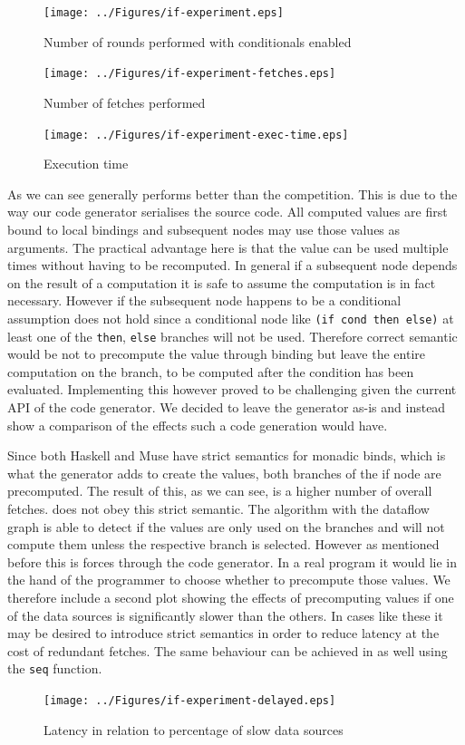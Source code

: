 \begin{figure}
    \texttt{[image: ../Figures/if-experiment.eps]}
    \caption{Number of rounds performed with conditionals enabled}
\end{figure}

\begin{figure}
    \texttt{[image: ../Figures/if-experiment-fetches.eps]}
    \caption{Number of fetches performed}
\end{figure}

\begin{figure}
    \texttt{[image: ../Figures/if-experiment-exec-time.eps]}
    \caption{Execution time}
\end{figure}

As we can see \yauhau{} generally performs better than the competition.
This is due to the way our code generator serialises the source code.
All computed values are first bound to local bindings and subsequent nodes may use those values as arguments.
The practical advantage here is that the value can be used multiple times without having to be recomputed.
In general if a subsequent node depends on the result of a computation it is safe to assume the computation is in fact necessary.
However if the subsequent node happens to be a conditional assumption does not hold since a conditional node like \texttt{(if cond then else)} at least one of the \texttt{then}, \texttt{else} branches will not be used.
Therefore correct semantic would be not to precompute the value through binding but leave the entire computation on the branch, to be computed after the condition has been evaluated.
Implementing this however proved to be challenging given the current API of the code generator.
We decided to leave the generator as-is and instead show a comparison of the effects such a code generation would have.

Since both Haskell and Muse have strict semantics for monadic binds, which is what the generator adds to create the values, both branches of the if node are precomputed.
The result of this, as we can see, is a higher number of overall fetches.
\yauhau{} does not obey this strict semantic. The algorithm with the dataflow graph is able to detect if the values are only used on the branches and will not compute them unless the respective branch is selected.
However as mentioned before this is forces through the code generator.
In a real program it would lie in the hand of the programmer to choose whether to precompute those values.
We therefore include a second plot showing the effects of precomputing values if one of the data sources is significantly slower than the others.
In cases like these it may be desired to introduce strict semantics in order to reduce latency at the cost of redundant fetches.
The same behaviour can be achieved in \yauhau{} as well using the \texttt{seq} function.

\begin{figure}
    \texttt{[image: ../Figures/if-experiment-delayed.eps]}
    \caption{Latency in relation to percentage of slow data sources}
\end{figure}
